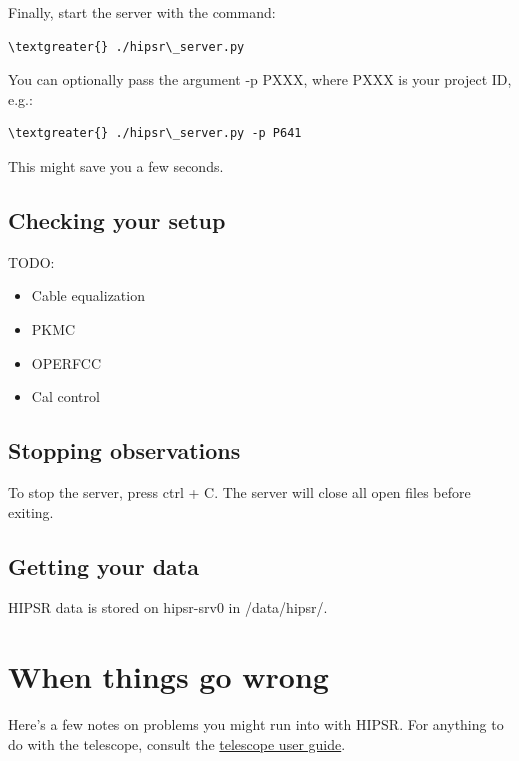 \documentclass[letterpaper,10pt,english]{sphinxmanual}
\begin{document}
Finally, start the server with the command:

\begin{Verbatim}[commandchars=\\\{\}]
\textgreater{} ./hipsr\_server.py
\end{Verbatim}

You can optionally pass the argument -p PXXX, where PXXX is your project ID, e.g.:

\begin{Verbatim}[commandchars=\\\{\}]
\textgreater{} ./hipsr\_server.py -p P641
\end{Verbatim}

This might save you a few seconds.


\subsection{Checking your setup}
\label{user_guide:checking-your-setup}
TODO:
\begin{itemize}
\item {} 
Cable equalization

\item {} 
PKMC

\item {} 
OPERFCC

\item {} 
Cal control

\end{itemize}


\subsection{Stopping observations}
\label{user_guide:stopping-observations}
To stop the server, press ctrl + C. The server will close all open files before exiting.


\subsection{Getting your data}
\label{user_guide:getting-your-data}
HIPSR data is stored on hipsr-srv0 in /data/hipsr/.


\section{When things go wrong}
\label{user_guide:when-things-go-wrong}
Here's a few notes on problems you might run into with HIPSR. For anything to do with the
telescope, consult the \href{http://www.parkes.atnf.csiro.au/observing/documentation/user\_guide/}{telescope user guide}.
\end{document}
